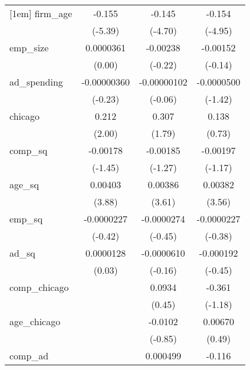 {\begin{tabular}{l*{3}{c}}
[1em]
firm\_age    &      -0.155\sym{***}&      -0.145\sym{***}&      -0.154\sym{***}\\
            &     (-5.39)         &     (-4.70)         &     (-4.95)         \\
[1em]
emp\_size    &   0.0000361         &    -0.00238         &    -0.00152         \\
            &      (0.00)         &     (-0.22)         &     (-0.14)         \\
[1em]
ad\_spending & -0.00000360         & -0.00000102         &  -0.0000500         \\
            &     (-0.23)         &     (-0.06)         &     (-1.42)         \\
[1em]
chicago     &       0.212\sym{*}  &       0.307         &       0.138         \\
            &      (2.00)         &      (1.79)         &      (0.73)         \\
[1em]
comp\_sq     &    -0.00178         &    -0.00185         &    -0.00197         \\
            &     (-1.45)         &     (-1.27)         &     (-1.17)         \\
[1em]
age\_sq      &     0.00403\sym{***}&     0.00386\sym{***}&     0.00382\sym{***}\\
            &      (3.88)         &      (3.61)         &      (3.56)         \\
[1em]
emp\_sq      &  -0.0000227         &  -0.0000274         &  -0.0000227         \\
            &     (-0.42)         &     (-0.45)         &     (-0.38)         \\
[1em]
ad\_sq       &   0.0000128         &  -0.0000610         &   -0.000192         \\
            &      (0.03)         &     (-0.16)         &     (-0.45)         \\
[1em]
comp\_chicago&                     &      0.0934         &      -0.361         \\
            &                     &      (0.45)         &     (-1.18)         \\
[1em]
age\_chicago &                     &     -0.0102         &     0.00670         \\
            &                     &     (-0.85)         &      (0.49)         \\
[1em]
comp\_ad     &                     &    0.000499         &      -0.116         \\

\end{tabular}}
